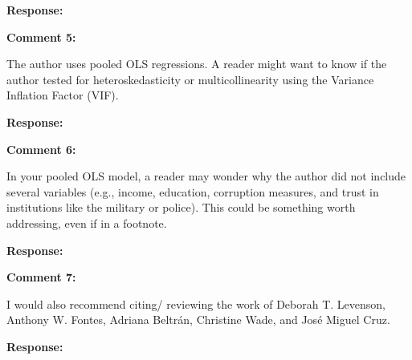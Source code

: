 \documentclass[12pt, a4paper, notitlepage]{article}
\begin{document}
\noindent\textbf{Response:}

\vspace{15pt}
\noindent\textbf{Comment 5:}
\begin{displayquote}
The author uses pooled OLS regressions. A reader might want to know if the author tested for heteroskedasticity or multicollinearity using the Variance Inflation Factor (VIF).
\end{displayquote}

\noindent\textbf{Response:}

\vspace{15pt}
\noindent\textbf{Comment 6:}
\begin{displayquote}
In your pooled OLS model, a reader may wonder why the author did not include several variables (e.g., income, education, corruption measures, and trust in institutions like the military or police). This could be something worth addressing, even if in a footnote.
\end{displayquote}

\noindent\textbf{Response:}

\vspace{15pt}
\noindent\textbf{Comment 7:}
\begin{displayquote}
I would also recommend citing/ reviewing the work of Deborah T. Levenson, Anthony W. Fontes, Adriana Beltrán, Christine Wade, and José Miguel Cruz.
\end{displayquote}

\noindent\textbf{Response:}
\end{document}
